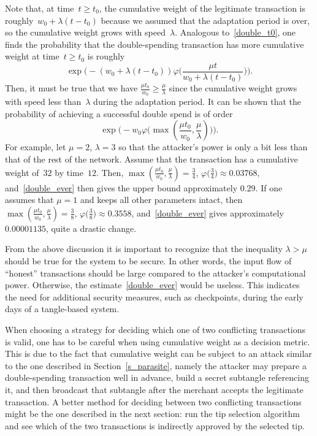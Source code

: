 \documentclass[12pt]{article}
\let\phi=\varphi
\begin{document}
Note that, at time~$t\geq t_0$, the cumulative weight
of the legitimate transaction is roughly~$w_0+\lambda (t-t_0)$
because we assumed that the adaptation period is over,
so the cumulative weight grows with speed~$\lambda$.
Analogous to~\eqref{double_t0}, 
one finds the probability that the double-spending transaction
has more cumulative weight at time~$t\geq t_0$ is roughly
\begin{equation}
\label{double_t}
 \exp\big(-(w_0+\lambda (t-t_0))
\phi\big(\textstyle\frac{\mu t}{w_0+\lambda (t-t_0)}\big)\big).
\end{equation}
Then, it must be true that we have $\frac{\mu t_0}{w_0}\geq 
\frac{\mu}{\lambda}$ since the cumulative weight grows with 
speed less than~$\lambda $ during the adaptation period. 
It can be shown that the probability 
of achieving a successful double spend is of order
\begin{equation}
\label{double_ever}
 \exp\big(-w_0\phi\big(\max(\textstyle\frac{\mu t_0}{w_0},
\frac{\mu}{\lambda})\big)\big).
\end{equation}
For example, let $\mu=2$, $\lambda=3$
so that the attacker's power is only a bit less than
that of the rest of the network. Assume that the 
transaction has a cumulative weight of~$32$ by time~$12$.
Then, $\max(\frac{\mu t_0}{w_0},\frac{\mu}{\lambda}) = \frac{3}{4}$,
$\phi\big(\frac{3}{4}\big)\approx 0.03768$,
and~\eqref{double_ever} then gives the upper bound 
approximately $0.29$. If one assumes that
$\mu=1$ and keeps all other parameters intact, then
$\max(\frac{\mu t_0}{w_0},\frac{\mu}{\lambda}) = \frac{3}{8}$,
$\phi\big(\frac{3}{8}\big)\approx 0.3558$,
and~\eqref{double_ever} gives approximately $0.00001135$,
quite a drastic change.


 From the above discussion it is important to recognize that 
 the inequality $\lambda > \mu$ should be true for the 
 system to be secure. 
In other words, the input flow of ``honest''
transactions should be large compared to the 
attacker's computational power. Otherwise, 
the estimate~\eqref{double_ever} would be useless. 
This indicates the need
for additional security measures, such as checkpoints,
during the early days of a tangle-based system.


When choosing a strategy for deciding which one of 
two conflicting transactions is valid, one has to be careful 
when using cumulative weight as a decision metric. 
This is due to the fact that cumulative weight can be subject
 to an attack similar
to the one described
in Section~\ref{s_parasite}, namely the attacker may prepare 
a double-spending transaction well in advance, build a 
secret subtangle referencing it, and then broadcast 
that subtangle after the merchant accepts the legitimate 
transaction.  
A better method for deciding 
between two conflicting transactions might be the one
described in the next section: run the tip selection algorithm
and see which of the two transactions is indirectly
approved by the selected tip.
\end{document}
